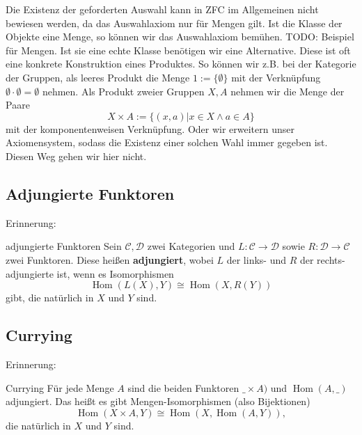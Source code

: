 \documentclass[a4paper]{amsart}
\theoremstyle{definition}
\DeclareMathOperator{\Hom}{Hom}
\begin{document}
Die Existenz der geforderten Auswahl kann in ZFC im Allgemeinen nicht bewiesen werden, da das Auswahlaxiom nur für Mengen gilt. Ist die Klasse der Objekte eine Menge, so können wir das Auswahlaxiom bemühen. TODO: Beispiel für Mengen. Ist sie eine echte Klasse benötigen wir eine Alternative. Diese ist oft eine konkrete Konstruktion eines Produktes. So können wir z.B. bei der Kategorie der Gruppen, als leeres Produkt die Menge $1 := \{ \emptyset \}$ mit der Verknüpfung $\emptyset \cdot \emptyset = \emptyset$ nehmen. Als Produkt zweier Gruppen $X, A$ nehmen wir die Menge der Paare
\begin{equation}
   X \times A := \{ (x, a) | x \in X \land a \in A \}
\end{equation}
mit der komponentenweisen Verknüpfung. Oder wir erweitern unser Axiomensystem, sodass die Existenz einer solchen Wahl immer gegeben ist. Diesen Weg gehen wir hier nicht.

\subsection{Adjungierte Funktoren}
Erinnerung:
\begin{Definition}{adjungierte Funktoren}
   Sein $  \mathcal C, \mathcal D$ zwei Kategorien und $  L \colon   \mathcal C \to   \mathcal D$ sowie 
   $R \colon   \mathcal D \to   \mathcal C$ zwei Funktoren. Diese heißen \textbf{adjungiert}, wobei $  L$ der links- und $  R$ der rechts-adjungierte ist, wenn es Isomorphismen
   \begin{equation}
      \Hom(  L( X ), Y ) \cong \Hom( X,   R( Y) ) 
   \end{equation}
   gibt, die natürlich in $X$ und $Y$ sind.
\end{Definition}

\subsection{Currying}
Erinnerung:
\begin{Definition}{Currying}
   Für jede Menge $A$ sind die beiden Funktoren $\_ \times A )$ und 
   $ \Hom( A, \_)$ adjungiert. Das heißt es gibt Mengen-Isomorphismen (also Bijektionen)
   \begin{equation}\label{curryingForSet2}
      \Hom(X \times A, Y ) \cong \Hom(X, \Hom( A, Y)),
   \end{equation}
   die natürlich in $X$ und $Y$ sind.
\end{Definition}
\end{document}
